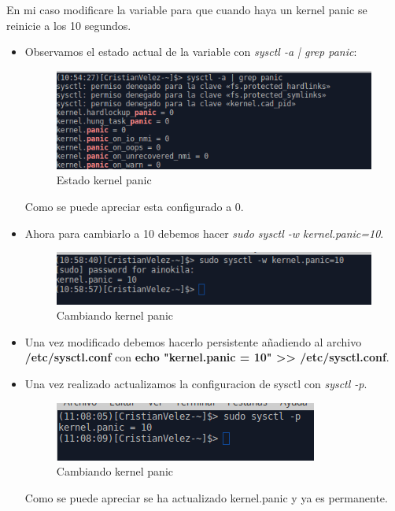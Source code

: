 En mi caso modificare la variable para que cuando haya un kernel panic se reinicie a los 10 segundos.

\begin{itemize}
	\item Observamos el estado actual de la variable con \textit{sysctl -a | grep panic}:
	
	\begin{figure}[H] %
		\centering
		\includegraphics[scale=0.5]{pics/kernel}  %
		\caption{Estado kernel panic} \label{fig:kernel1}
	\end{figure}
	Como se puede apreciar esta configurado a 0.
	
	\item Ahora para cambiarlo a 10 debemos hacer \textit{sudo sysctl -w kernel.panic=10}.
	
	\begin{figure}[H] %
		\centering
		\includegraphics[scale=0.5]{pics/kernel1}  %
		\caption{Cambiando kernel panic} \label{fig:kernel2}
	\end{figure}

	\item Una vez modificado debemos hacerlo persistente añadiendo al archivo \textbf{/etc/sysctl.conf} con \textbf{echo "kernel.panic = 10" >> /etc/sysctl.conf}.

\item Una vez realizado actualizamos la configuracion de sysctl con \textit{sysctl -p}.

\begin{figure}[H] %
	\centering
	\includegraphics[scale=0.5]{pics/kernel2}  %
	\caption{Cambiando kernel panic} \label{fig:kernel3}
\end{figure}

Como se puede apreciar se ha actualizado kernel.panic y ya es permanente.
\end{itemize}

